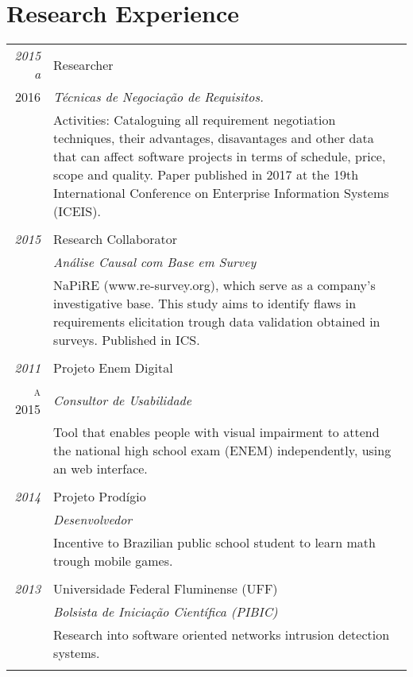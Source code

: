 \documentclass[a4paper,10pt]{article}
\begin{document}
 \section{Research Experience}
\begin{tabular}{r|p{11cm}}
 \emph{2015 a} & Researcher \\
 \textsc{2016}&\emph{Técnicas de Negociação de Requisitos.}\\
 &\footnotesize{Activities: Cataloguing all requirement negotiation techniques, their advantages, disavantages and other data that can affect software projects in terms of schedule, price, scope and quality. Paper published in 2017 at the 19th International Conference on Enterprise Information Systems (ICEIS).}\\
 
 & \\
 
 \emph{2015} & Research Collaborator \\
 \textsc{}&\emph{Análise Causal com Base em Survey}\\
 &\footnotesize{NaPiRE (www.re-survey.org), which serve as a company's investigative base. This study aims to identify flaws in requirements elicitation trough data validation obtained in surveys. Published in ICS.}\\
 
 & \\
 
 \emph{2011} & Projeto Enem Digital \\
 \textsc{a 2015}&\emph{Consultor de Usabilidade}\\
 &\footnotesize{Tool that enables people with visual impairment to attend the national high school exam (ENEM) independently, using an web interface.}\\
 
 & \\
 
 \emph{2014} & Projeto Prodígio \\
 \textsc{}&\emph{Desenvolvedor}\\
 &\footnotesize{Incentive to Brazilian public school student to learn math trough mobile games.}\\
 
 & \\
 
 \emph{2013} & Universidade Federal Fluminense (UFF) \\
 \textsc{}&\emph{Bolsista de Iniciação Científica (PIBIC)}\\
 &\footnotesize{Research into software oriented networks intrusion detection systems.}\\
 
 \multicolumn{2}{c}{} \end{tabular}
\end{document}
